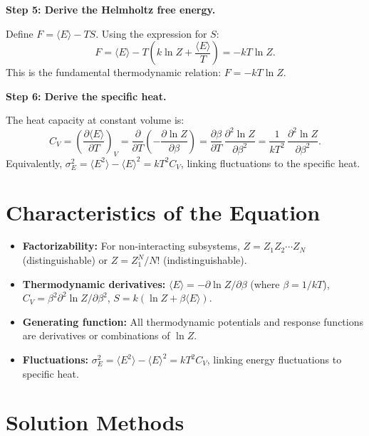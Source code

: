 \textbf{Step 5: Derive the Helmholtz free energy.}

Define $F = \langle E\rangle - TS$. Using the expression for $S$:
\begin{equation}
F = \langle E\rangle - T\!\left(k\ln Z + \frac{\langle E\rangle}{T}\right) = -kT\ln Z.
\end{equation}
This is the fundamental thermodynamic relation: $F = -kT\ln Z$.

\textbf{Step 6: Derive the specific heat.}

The heat capacity at constant volume is:
\begin{equation}
C_V = \left(\frac{\partial \langle E\rangle}{\partial T}\right)_V = \frac{\partial}{\partial T}\!\left(-\frac{\partial \ln Z}{\partial \beta}\right) = \frac{\partial \beta}{\partial T}\,\frac{\partial^{2}\ln Z}{\partial \beta^{2}} = \frac{1}{kT^{2}}\,\frac{\partial^{2}\ln Z}{\partial \beta^{2}}.
\end{equation}
Equivalently, $\sigma_E^{2} = \langle E^{2}\rangle - \langle E\rangle^{2} = kT^{2}C_V$, linking fluctuations to the specific heat.

\section*{Characteristics of the Equation}

\begin{itemize}
  \item \textbf{Factorizability:} For non-interacting subsystems, $Z = Z_{1}Z_{2}\cdots Z_{N}$ (distinguishable) or $Z = Z_{1}^{N}/N!$ (indistinguishable).
  \item \textbf{Thermodynamic derivatives:} $\langle E\rangle = -\partial\ln Z/\partial\beta$ (where $\beta = 1/kT$), $C_{V} = \beta^{2}\partial^{2}\ln Z/\partial\beta^{2}$, $S = k(\ln Z + \beta\langle E\rangle)$.
  \item \textbf{Generating function:} All thermodynamic potentials and response functions are derivatives or combinations of $\ln Z$.
  \item \textbf{Fluctuations:} $\sigma_{E}^{2} = \langle E^{2}\rangle - \langle E\rangle^{2} = kT^{2}C_{V}$, linking energy fluctuations to specific heat.
\end{itemize}
\section*{Solution Methods}

